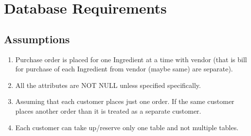 \section{Database Requirements} \label{cap:reqs}

\subsection{Assumptions}
    \begin{enumerate}
        \item Purchase order is placed for one Ingredient at a time with vendor (that is bill for purchase of each Ingredient from vendor (maybe same) are separate).
        \item All the attributes are NOT NULL unless specified specifically.
        \item Assuming that each customer places just one order. If the same customer places another order than it is treated as a separate customer.
        \item Each customer can take up/reserve only one table and not multiple tables.
    \end{enumerate}

